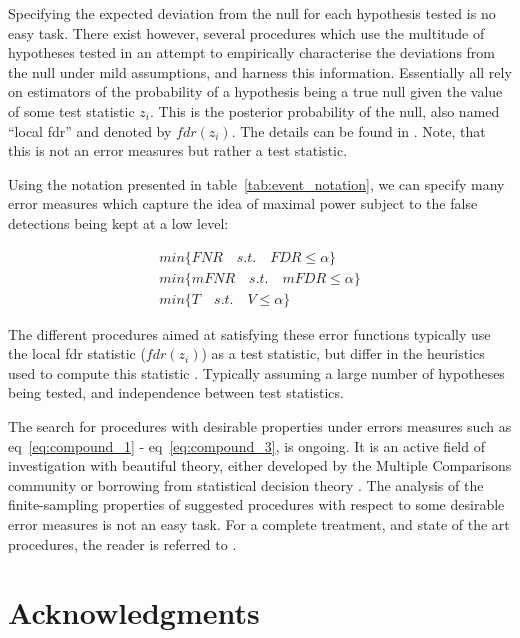 \documentclass[review,12pt]{article}
\begin{document}
Specifying the expected deviation from the null for each hypothesis tested is no easy task. There exist however, several procedures which use the multitude of hypotheses tested in an attempt to empirically characterise the deviations from the null under mild assumptions, and harness this information. Essentially all   rely on estimators of the probability of a hypothesis being a true null given the value of some test statistic $z_i$. This is the posterior probability of the null, also named ``local fdr'' and denoted by $fdr(z_i)$. The details can be found in \cite{efron_microarrays_2008}. Note, that this is not an error measures but rather a test statistic.  

Using the notation presented in table~\ref{tab:event_notation}, we can specify many error measures which capture the idea of maximal power subject to the false detections being kept at a low level:

\begin{align}
        min\{FNR \quad s.t. \quad FDR\leq \alpha \} \label{eq:compound_1}\\
	min\{mFNR \quad s.t. \quad mFDR\leq \alpha \} \label{eq:compound_2}\\
	min\{T \quad s.t. \quad V \leq \alpha \} \label{eq:compound_3}
\end{align}


The different procedures aimed at satisfying these error functions typically use the local fdr statistic ($fdr(z_i)$) as a test statistic, but differ in the heuristics used to  compute this statistic \cite[eg.][]{storey_direct_2002,efron_microarrays_2008,sun_oracle_2007}. Typically assuming a large number of hypotheses being tested, and independence between test statistics. 

The search for procedures with desirable properties under errors measures such as eq~\ref{eq:compound_1}  - eq~\ref{eq:compound_3}, is ongoing. It is an active field of investigation with beautiful theory, either developed by the Multiple Comparisons community or borrowing from statistical decision theory \cite[see][]{sun_oracle_2007}. The analysis of the finite-sampling properties of suggested procedures with respect to some desirable error measures is not an easy task.  For a complete treatment, and state of the art procedures, the reader is referred to \cite{efron2010large}.








\section{Acknowledgments}
\end{document}

